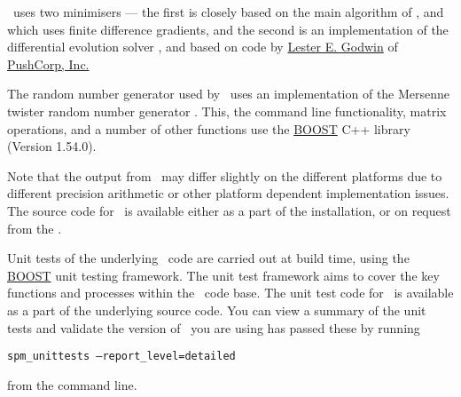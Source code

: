 \SPM\ uses two minimisers --- the first is closely based on the main algorithm of \cite{779}, and which uses finite difference gradients, and the second is an implementation of the differential evolution solver \citep{1442}, and based on code by \href{mailto:<godwin@pushcorp.com>}{Lester E. Godwin} of \href{http://www.pushcorp.com}{PushCorp, Inc.} 

The random number generator used by \SPM\ uses an implementation of the Mersenne twister random number generator \citep{796}. This, the command line functionality, matrix operations, and a number of other functions use the \href{http://www.boost.org/}{BOOST} C++ library (Version 1.54.0).

Note that the output from \SPM\ may differ slightly on the different platforms due to different precision arithmetic or other platform dependent implementation issues. The source code for \SPM\ is available either as a part of the installation, or on request from the \authors.

Unit tests of the underlying \SPM\ code are carried out at build time, using the \href{http://www.boost.org/}{BOOST} unit testing framework. The unit test framework aims to cover the key functions and processes within the \SPM\ code base. The unit test code for \SPM\ is available as a part of the underlying source code. You can view a summary of the unit tests and validate the version of \SPM\ you are using has passed these by running

\texttt{spm\_unittests --report\_level=detailed} 

from the command line.


